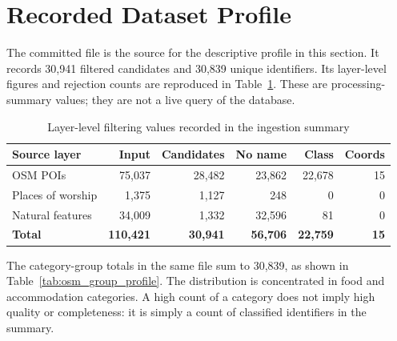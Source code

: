 \section{Recorded Dataset Profile}

The committed file  is the source for the descriptive profile in this section. It records 30,941 filtered candidates and 30,839 unique identifiers. Its layer-level figures and rejection counts are reproduced in Table~\ref{tab:osm_layer_profile}. These are processing-summary values; they are not a live query of the database.

\begin{table}[htbp]
    \centering
    \caption{Layer-level filtering values recorded in the ingestion summary}
    \label{tab:osm_layer_profile}
    \renewcommand{\arraystretch}{1.2}
    \small
    \setlength{\tabcolsep}{3.5pt}
    \begin{tabularx}{\textwidth}{>{\raggedright\arraybackslash}X r r r r r}
        \toprule
        \textbf{Source layer} & \textbf{Input} & \textbf{Candidates} & \textbf{No name} & \textbf{Class} & \textbf{Coords} \\
        \midrule
        OSM POIs & 75,037 & 28,482 & 23,862 & 22,678 & 15 \\
        Places of worship & 1,375 & 1,127 & 248 & 0 & 0 \\
        Natural features & 34,009 & 1,332 & 32,596 & 81 & 0 \\
        \midrule
        \textbf{Total} & \textbf{110,421} & \textbf{30,941} & \textbf{56,706} & \textbf{22,759} & \textbf{15} \\
        \bottomrule
    \end{tabularx}
\end{table}
The category-group totals in the same file sum to 30,839, as shown in Table~\ref{tab:osm_group_profile}. The distribution is concentrated in food and accommodation categories. A high count of a category does not imply high quality or completeness: it is simply a count of classified identifiers in the summary.

